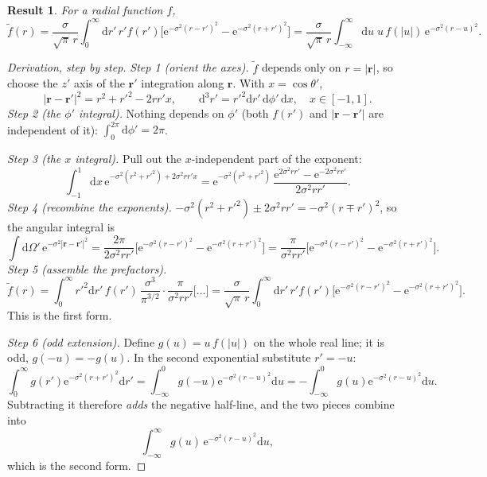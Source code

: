 \documentclass[11pt,a4paper]{article}
\numberwithin{equation}{section}
\theoremstyle{definition}
\theoremstyle{plain}
\newtheorem{result}[definition]{Result}
\theoremstyle{remark}
\numberwithin{algorithm}{section}
\newcommand{\vr}{\bm r}
\newcommand{\dd}{\mathrm{d}}
\newcommand{\ee}{\mathrm{e}}
\begin{document}
\begin{result}
For a radial function $f$,
\begin{equation}
\tilde f(r)=\frac{\sigma}{\sqrt\pi\,r}\int_0^\infty\dd r'\,r'f(r')\Big[\ee^{-\sigma^2(r-r')^2}-\ee^{-\sigma^2(r+r')^2}\Big]
=\frac{\sigma}{\sqrt\pi\,r}\int_{-\infty}^{\infty}\dd u\;u\,f(|u|)\,\ee^{-\sigma^2(r-u)^2}.
\label{eq:radconv}
\end{equation}
\end{result}
\begin{proof}[Derivation, step by step]
\emph{Step 1 (orient the axes).} $\tilde f$ depends only on $r=|\vr|$, so choose the $z'$ axis of the $\vr'$ integration along $\vr$. With $x=\cos\theta'$,
\begin{equation*}
|\vr-\vr'|^2=r^2+r'^2-2rr'x,\qquad \dd^3r'=r'^2\dd r'\,\dd\phi'\,\dd x,\quad x\in[-1,1].
\end{equation*}
\emph{Step 2 (the $\phi'$ integral).} Nothing depends on $\phi'$ (both $f(r')$ and $|\vr-\vr'|$ are independent of it): $\int_0^{2\pi}\dd\phi'=2\pi$.

\emph{Step 3 (the $x$ integral).} Pull out the $x$-independent part of the exponent:
\begin{equation*}
\int_{-1}^1\dd x\,\ee^{-\sigma^2(r^2+r'^2)+2\sigma^2rr'x}=\ee^{-\sigma^2(r^2+r'^2)}\,\frac{\ee^{2\sigma^2rr'}-\ee^{-2\sigma^2rr'}}{2\sigma^2rr'} .
\end{equation*}
\emph{Step 4 (recombine the exponents).} $-\sigma^2(r^2+r'^2)\pm2\sigma^2rr'=-\sigma^2(r\mp r')^2$, so the angular integral is
\begin{equation*}
\int\dd\Omega'\,\ee^{-\sigma^2|\vr-\vr'|^2}=\frac{2\pi}{2\sigma^2rr'}\Big[\ee^{-\sigma^2(r-r')^2}-\ee^{-\sigma^2(r+r')^2}\Big]=\frac{\pi}{\sigma^2rr'}\Big[\ee^{-\sigma^2(r-r')^2}-\ee^{-\sigma^2(r+r')^2}\Big].
\end{equation*}
\emph{Step 5 (assemble the prefactors).}
\begin{equation*}
\tilde f(r)=\int_0^\infty r'^2\dd r'\,f(r')\,\frac{\sigma^3}{\pi^{3/2}}\cdot\frac{\pi}{\sigma^2rr'}\big[\dots\big]
=\frac{\sigma}{\sqrt\pi\,r}\int_0^\infty\dd r'\,r'f(r')\big[\ee^{-\sigma^2(r-r')^2}-\ee^{-\sigma^2(r+r')^2}\big].
\end{equation*}
This is the first form.

\emph{Step 6 (odd extension).} Define $g(u)=u\,f(|u|)$ on the whole real line; it is odd, $g(-u)=-g(u)$. In the second exponential substitute $r'=-u$:
\begin{equation*}
\int_0^\infty g(r')\ee^{-\sigma^2(r+r')^2}\dd r'=\int_{-\infty}^0g(-u)\ee^{-\sigma^2(r-u)^2}\dd u=-\int_{-\infty}^0g(u)\ee^{-\sigma^2(r-u)^2}\dd u .
\end{equation*}
Subtracting it therefore \emph{adds} the negative half-line, and the two pieces combine into
\begin{equation*}
\int_{-\infty}^\infty g(u)\,\ee^{-\sigma^2(r-u)^2}\dd u,
\end{equation*}
which is the second form.
\end{proof}
\end{document}
